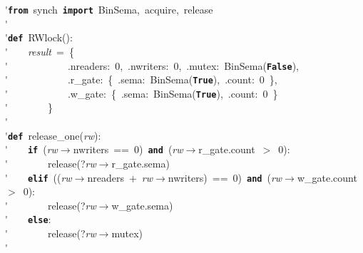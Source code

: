 \'\>\texttt{\textbf{from}}~synch~\texttt{\textbf{import}}~BinSema,~acquire,~release\\

\'\>\\

\'\>\texttt{\textbf{def}}~RWlock():\\

\'\>~~~~\textit{result}~=~\{\\

\'\>~~~~~~~~~~~~.nreaders:~0,~.nwriters:~0,~.mutex:~BinSema(\texttt{\textbf{False}}),\\

\'\>~~~~~~~~~~~~.r\_gate:~\{~.sema:~BinSema(\texttt{\textbf{True}}),~.count:~0~\},\\

\'\>~~~~~~~~~~~~.w\_gate:~\{~.sema:~BinSema(\texttt{\textbf{True}}),~.count:~0~\}\\

\'\>~~~~~~~~\}\\

\'\>\\

\'\>\texttt{\textbf{def}}~release\_one(\textit{rw}):\\

\'\>~~~~\texttt{\textbf{if}}~(\textit{rw}$\rightarrow$nwriters~==~0)~\texttt{\textbf{and}}~(\textit{rw}$\rightarrow$r\_gate.count~$>$~0):\\

\'\>~~~~~~~~release(?\textit{rw}$\rightarrow$r\_gate.sema)\\

\'\>~~~~\texttt{\textbf{elif}}~((\textit{rw}$\rightarrow$nreaders~+~\textit{rw}$\rightarrow$nwriters)~==~0)~\texttt{\textbf{and}}~(\textit{rw}$\rightarrow$w\_gate.count~$>$~0):\\

\'\>~~~~~~~~release(?\textit{rw}$\rightarrow$w\_gate.sema)\\

\'\>~~~~\texttt{\textbf{else}}:\\

\'\>~~~~~~~~release(?\textit{rw}$\rightarrow$mutex)\\

\'\>\\

